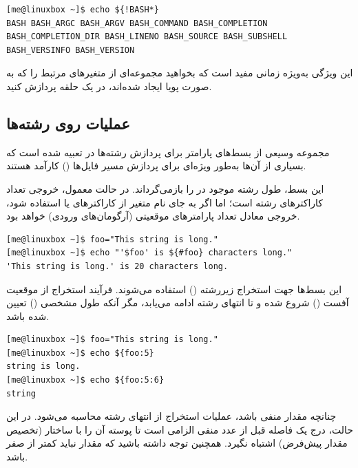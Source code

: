 \begin{latin}
\begin{lstlisting}
[me@linuxbox ~]$ echo ${!BASH*}
BASH BASH_ARGC BASH_ARGV BASH_COMMAND BASH_COMPLETION BASH_COMPLETION_DIR BASH_LINENO BASH_SOURCE BASH_SUBSHELL BASH_VERSINFO BASH_VERSION
\end{lstlisting}
\end{latin}

این ویژگی به‌ویژه زمانی مفید است که بخواهید مجموعه‌ای از متغیرهای مرتبط را که به صورت پویا ایجاد شده‌اند، در یک حلقه پردازش کنید.

\subsection{عملیات روی رشته‌ها}

مجموعه وسیعی از بسط‌های پارامتر برای پردازش رشته‌ها در  تعبیه شده است که بسیاری از آن‌ها به‌طور ویژه‌ای برای پردازش مسیر فایل‌ها () کارآمد هستند.

\textbf{}

این بسط، طول رشته موجود در  را بازمی‌گرداند. در حالت معمول، خروجی تعداد کاراکترهای رشته است؛ اما اگر به جای نام متغیر از کاراکترهای  یا \cmd{*} استفاده شود، خروجی معادل تعداد پارامترهای موقعیتی (آرگومان‌های ورودی) خواهد بود.

\begin{latin}
\begin{lstlisting}
[me@linuxbox ~]$ foo="This string is long."
[me@linuxbox ~]$ echo "'$foo' is ${#foo} characters long."
'This string is long.' is 20 characters long.
\end{lstlisting}
\end{latin}

\textbf{}
\textbf{}

این بسط‌ها جهت استخراج زیررشته () استفاده می‌شوند. فرآیند استخراج از موقعیت آفست () شروع شده و تا انتهای رشته ادامه می‌یابد، مگر آنکه طول مشخصی () تعیین شده باشد.

\begin{latin}
\begin{lstlisting}
[me@linuxbox ~]$ foo="This string is long."
[me@linuxbox ~]$ echo ${foo:5}
string is long.
[me@linuxbox ~]$ echo ${foo:5:6}
string
\end{lstlisting}
\end{latin}

چنانچه مقدار  منفی باشد، عملیات استخراج از انتهای رشته محاسبه می‌شود. در این حالت، درج یک فاصله قبل از عدد منفی الزامی است تا پوسته آن را با ساختار  (تخصیص مقدار پیش‌فرض) اشتباه نگیرد. همچنین توجه داشته باشید که مقدار  نباید کمتر از صفر باشد.

